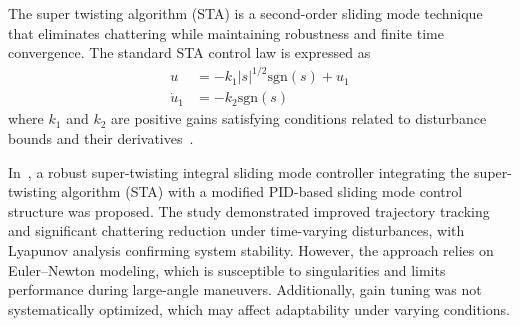 The super twisting algorithm (STA) is a second-order sliding mode technique that eliminates chattering while maintaining robustness and finite time convergence. The standard STA control law is expressed as
\begin{align}
u &= -k_1 |s|^{1/2} \mathrm{sgn}(s) + u_1 \\
\dot{u}_1 &= -k_2 \mathrm{sgn}(s)
\end{align}
where $k_1$ and $k_2$ are positive gains satisfying conditions related to disturbance bounds and their derivatives~\cite{gedefaw2024improved,labbadi2020novel,abera2024improved}.



\noindent In~\cite{labbadi2020novel}, a robust super-twisting integral sliding mode controller integrating the super-twisting algorithm (STA) with a modified PID-based sliding mode control structure was proposed. The study demonstrated improved trajectory tracking and significant chattering reduction under time-varying disturbances, with Lyapunov analysis confirming system stability. However, the approach relies on Euler–Newton modeling, which is susceptible to singularities and limits performance during large-angle maneuvers. Additionally, gain tuning was not systematically optimized, which may affect adaptability under varying conditions.


